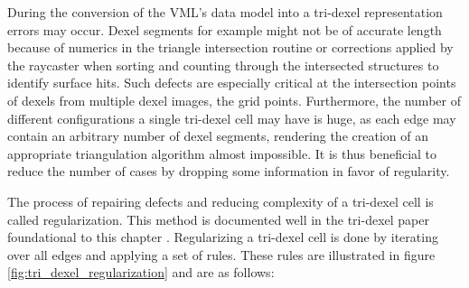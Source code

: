 During the conversion of the VML's data model into a tri-dexel representation errors may occur.
Dexel segments for example might not be of accurate length because of numerics in the triangle intersection routine or corrections applied by the raycaster when sorting and counting through the intersected structures to identify surface hits.
Such defects are especially critical at the intersection points of dexels from multiple dexel images, the grid points.
Furthermore, the number of different configurations a single tri-dexel cell may have is huge, as each edge may contain an arbitrary number of dexel segments, rendering the creation of an appropriate triangulation algorithm almost impossible.
It is thus beneficial to reduce the number of cases by dropping some information in favor of regularity.

The process of repairing defects and reducing complexity of a tri-dexel cell is called regularization.
This method is documented well in the tri-dexel paper foundational to this chapter \cite{tridexel_reconstruction}.
Regularizing a tri-dexel cell is done by iterating over all edges and applying a set of rules.
These rules are illustrated in figure \ref{fig:tri_dexel_regularization} and are as follows:

